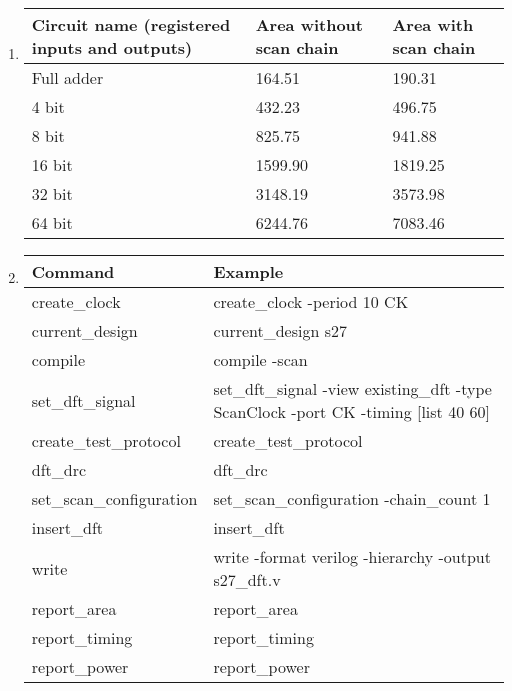 \documentclass[a4paper,12pt]{article}
\begin{document}
\begin{enumerate}
        \item \begin{tabularx}{\textwidth}{|X|X|X|}
                \hline
                Circuit name (registered inputs and outputs) & Area without scan chain & Area with scan chain \\ \hline
                Full adder & 164.51 & 190.31\\ \hline
                4 bit & 432.23 & 496.75\\ \hline
                8 bit & 825.75 & 941.88\\ \hline
                16 bit & 1599.90 & 1819.25\\ \hline
                32 bit & 3148.19 & 3573.98\\ \hline
                64 bit & 6244.76 & 7083.46\\ \hline
            \end{tabularx}

        \item \begin{tabularx}{\textwidth}{|X|X|}
                \hline
                Command & Example \\ \hline
                create\_clock & create\_clock -period 10 CK \\ \hline
                current\_design & current\_design s27 \\ \hline
                compile & compile -scan \\ \hline
                set\_dft\_signal & set\_dft\_signal -view existing\_dft -type ScanClock -port CK -timing [list 40 60] \\ \hline
                create\_test\_protocol & create\_test\_protocol \\ \hline
                dft\_drc & dft\_drc \\ \hline
                set\_scan\_configuration & set\_scan\_configuration -chain\_count 1 \\ \hline
                insert\_dft & insert\_dft \\ \hline
                write & write -format verilog -hierarchy -output s27\_dft.v \\ \hline
                report\_area & report\_area \\ \hline
                report\_timing & report\_timing \\ \hline
                report\_power & report\_power \\ \hline
            \end{tabularx}

    \end{enumerate}
\end{document}
